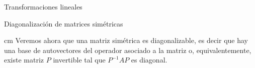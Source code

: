 \documentclass[a4paper,12pt,twoside,spanish,reqno]{amsbook}
\numberwithin{equation}{section}
\newtheorem{proposicion}[teorema]{Proposici\'on}
\theoremstyle{definition}
\theoremstyle{remark}
\newtheorem*{ejemplo*}{Ejemplo}
\renewcommand{\t}{{\operatorname{t}}}
\begin{document}
\begin{chapter}{Transformaciones lineales}
\begin{section}{Diagonalización de matrices simétricas}
    
    
     \begin{comment}
         \begin{proposicion} Sean $A$ y $B$ dos matrices simétricas. Entonces, $AB$  es simétrica si y sólo  si $A$ y $B$ conmutan. 
         \end{proposicion}
         \begin{proof}
         ($\Rightarrow$) Como $AB$ es simétrica, tenemos que $AB = (AB)^\t$. Por proposición \ref{prop-matriz-transpuesta} tenemos que  $(AB)^\t = B^\t A^\t$, y  como $A,B$ son simétricas, $B^\t A^\t = BA$. 
         Reconstruyendo las igualdades tenemos
         $$
         AB = (AB)^\t = B^\t A^\t = BA,
         $$
         es decir, $A$ y $B$ conmutan.
         
         \vskip .3cm
         
         ($\Leftarrow$)  
         $$
         (AB)^\t = B^\t A^\t = BA=AB.
         $$
         \end{proof}
         
         
         \begin{ejemplo*}
         Sean 
         \begin{equation*}
         A = \begin{bmatrix} 1&0\\0&2 \end{bmatrix} \quad \text{ y } \quad B = \begin{bmatrix}0&1\\1&0\end{bmatrix}.
         \end{equation*}
         Tanto $A$ como $B$ son matrices simétricas. Sin embargo, 
         \begin{align*}
         AB = \begin{bmatrix}0&1\\2&0\end{bmatrix} 
         \end{align*}
         no es simétrica. Esto ocurre, pues $A$ y $B$ no conmutan. 
         \end{ejemplo*}
         
     \end{comment}
    
    
    
     cm
    Veremos ahora que una matriz simétrica es diagonalizable, es decir que hay una base de autovectores del operador asociado a la matriz o, equivalentemente, existe matriz $P$ invertible tal que $P^{-1}AP$ es diagonal. 
    

\end{section}
\end{chapter}
\end{document}
